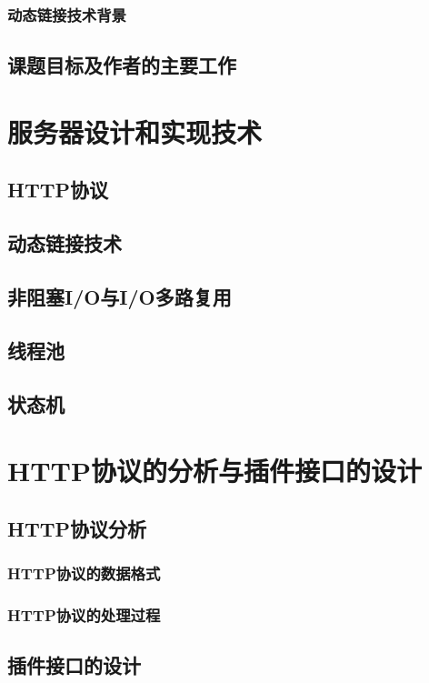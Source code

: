 \documentclass[18pt, twoside, a4paper, dvipdfm]{book}
\begin{document}
\subsection{动态链接技术背景}

\section{课题目标及作者的主要工作}

\chapter{服务器设计和实现技术}

\section{HTTP协议}
\section{动态链接技术}
\section{非阻塞I/O与I/O多路复用}
\section{线程池}
\section{状态机}

\chapter{HTTP协议的分析与插件接口的设计}

\section{HTTP协议分析}
\subsection{HTTP协议的数据格式}
\subsection{HTTP协议的处理过程}

\section{插件接口的设计}
\end{document}
